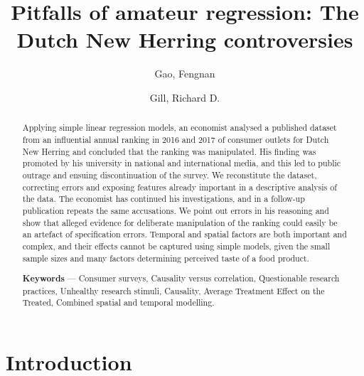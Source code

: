 \documentclass[alpha-refs]{wiley-article}
\title{Pitfalls of amateur regression: The Dutch New Herring controversies} %
\author[1]{Gao, Fengnan}
\affil[1]{School of Data Science, Fudan University, China, and
              Shanghai Center for Mathematical Sciences}
\author[2]{Gill, Richard D.}
\affil[2]{Mathematical Institute, Leiden University, Netherlands}
\newcommand{\fn}[1]{\textcolor{purple}{#1}}
\begin{document}
\maketitle
\begin{abstract}

Applying simple linear regression models, an economist analysed a published dataset from an influential annual ranking in 2016 and 2017 of consumer outlets for Dutch New Herring and concluded that the ranking was manipulated.  His finding was promoted by his university in national and international media, and this led to public outrage and ensuing discontinuation of the survey.  We reconstitute the dataset, correcting errors and exposing features already important in a descriptive analysis of the data.  The economist has continued his investigations, and in a follow-up publication repeats the same accusations.  We point out errors in his reasoning and show that alleged evidence for deliberate manipulation of the ranking could easily be an artefact of specification errors.  Temporal and spatial factors are both important and complex, and their effects cannot be captured using simple models, given the small sample sizes and many factors determining perceived taste of a food product. 


\textbf{Keywords} --- Consumer surveys, Causality versus correlation, Questionable research practices, Unhealthy research stimuli, Causality,  Average Treatment Effect on the Treated, Combined spatial and temporal modelling.
\end{abstract}





\section{Introduction}
\label{intro}

\end{document}
